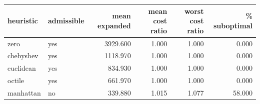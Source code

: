 \begin{tabular}{llrrrr}
\toprule
heuristic & admissible & mean expanded & mean cost ratio & worst cost ratio & \% suboptimal \\
\midrule
zero & yes & 3929.600 & 1.000 & 1.000 & 0.000 \\
chebyshev & yes & 1118.970 & 1.000 & 1.000 & 0.000 \\
euclidean & yes & 834.930 & 1.000 & 1.000 & 0.000 \\
octile & yes & 661.970 & 1.000 & 1.000 & 0.000 \\
manhattan & no & 339.880 & 1.015 & 1.077 & 58.000 \\
\bottomrule
\end{tabular}
